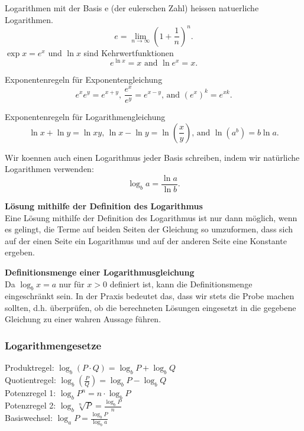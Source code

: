 \begin{multicols}{2}
    Logarithmen mit der Basis e (der eulerschen Zahl) heissen natuerliche Logarithmen.
    \begin{equation*}
        e = \lim\limits_{n\rightarrow\infty}{\left(1+\frac{1}{n}\right)^n}.
    \end{equation*}
    \noindent
    $\exp{x} = e^x$ und $\ln{x}$ sind Kehrwertfunktionen
    \begin{equation*}
        e^{\ln{x}} = x \text{ and } \ln{e^x} = x.
    \end{equation*}

    \noindent
    Exponentenregeln für Exponentengleichung
    \begin{equation*}
        e^xe^y = e^{x+y} \text{, } \frac{e^x}{e^y}=e^{x-y} \text{, and } \left(e^x\right)^k=e^{xk}.
    \end{equation*}

    \noindent
    Exponentenregeln für Logarithmengleichung
    \begin{equation*}
        \ln{x}+\ln{y} = \ln{xy} \text{, } \ln{x}-\ln{y} = \ln{\left(\frac{x}{y}\right)} \text{, and } \ln{\left(a^b\right)} = b\ln{a}.
    \end{equation*}

    \noindent
    Wir koennen auch einen Logarithmus jeder Basis schreiben, indem wir natürliche Logarithmen verwenden:
    \begin{equation*}
        \log_{b}{a} = \frac{\ln{a}}{\ln{b}}.
    \end{equation*}

    \textbf{Lösung mithilfe der Definition des Logarithmus}\\
    Eine Lösung mithilfe der Definition des Logarithmus ist nur dann möglich, wenn es gelingt, die Terme auf beiden Seiten der Gleichung so umzuformen, dass sich auf der einen Seite ein Logarithmus und auf der anderen Seite eine Konstante ergeben.

    \textbf{Definitionsmenge einer Logarithmusgleichung }\\
    Da $\log_{b}x = a$  nur für $x > 0$ definiert ist, kann die Definitionsmenge eingeschränkt sein.
    In der Praxis bedeutet das, dass wir stets die Probe machen sollten, d.h. überprüfen, ob die berechneten Lösungen eingesetzt in die gegebene Gleichung zu einer wahren Aussage führen.
    \subsubsection{Logarithmengesetze}
    \vspace{-4mm}
    Produktregel: $\log_b(P \cdot Q) = \log_b P + \log_b Q$ \\
    Quotientregel: $\log_b\left(\frac{P}{Q}\right) = \log_b P - \log_b Q$ \\
    Potenzregel 1: $\log_b P^n = n \cdot \log_b P$ \\
    Potenzregel 2: $\log_b \sqrt[n]{P} = \frac{\log_b P}{n}$ \\
    Basiswechsel: $\log_a P = \frac{\log_b P}{\log_b a}$





\end{multicols}
